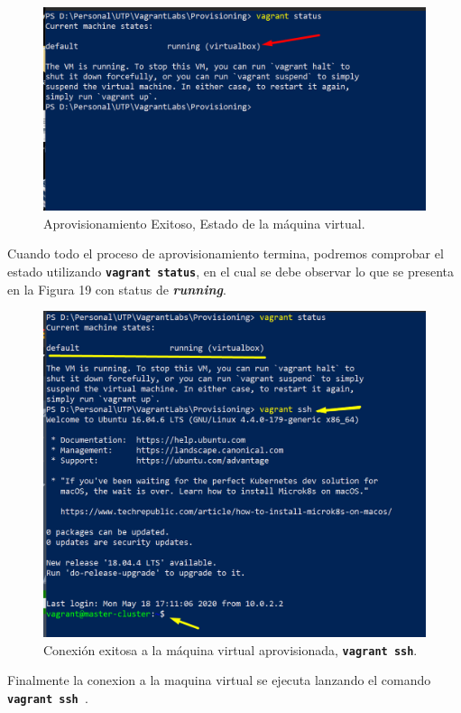 \documentclass[letterpaper, 12pt, oneside]{article}
\begin{document}
    \begin{figure}[H]
        \includegraphics[scale=1]{img/provision/running.png}
        \caption{Aprovisionamiento Exitoso, Estado de la máquina virtual.}
        \label{fig:va6}
    \end{figure}
    Cuando todo el proceso de aprovisionamiento termina, podremos comprobar el estado utilizando \textbf{\texttt{vagrant status}}, en el cual se debe observar lo que se presenta en la Figura 19 con status de \textbf{\textit{running}}. 
    \begin{center}
    \begin{figure}[H]
        \includegraphics[scale=1]{img/provision/running2.png}
        \caption{Conexión exitosa a la máquina virtual aprovisionada, \textbf{\texttt{vagrant ssh}}.}
        \label{fig:va6}
    \end{figure}
    \end{center}
    Finalmente la conexion a la maquina virtual se ejecuta lanzando el comando \textbf{\texttt{vagrant ssh }}.
\end{document}
